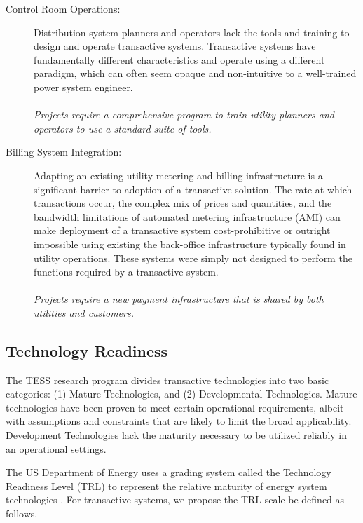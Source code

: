 \documentclass[10pt,twocolumn]{article}
\begin{document}
\begin{description}
    \item[Control Room Operations:] Distribution system planners and operators lack the tools and training to design and operate transactive systems. Transactive systems have fundamentally different characteristics and operate using a different paradigm, which can often seem opaque and non-intuitive to a well-trained power system engineer.  
    \\~\\
    \textit{Projects require a comprehensive program to train utility planners and operators to use a standard suite of tools.} 

    \item[Billing System Integration:] Adapting an existing utility metering and billing infrastructure is a significant barrier to adoption of a transactive solution.  The rate at which transactions occur, the complex mix of prices and quantities, and the bandwidth limitations of automated metering infrastructure (AMI) can make deployment of a transactive system cost-prohibitive or outright impossible using existing the back-office infrastructure typically found in utility operations. These systems were simply not designed to perform the functions required by a transactive system.  
    \\~\\
    \textit{Projects require a new payment infrastructure that is shared by both utilities and customers.}

\end{description}

\subsection{Technology Readiness}

The TESS research program divides transactive technologies into two basic categories: (1) Mature Technologies, and (2) Developmental Technologies.  Mature technologies have been proven to meet certain operational requirements, albeit with assumptions and constraints that are likely to limit the broad applicability.  Development Technologies lack the maturity necessary to be utilized reliably in an operational settings.

The US Department of Energy uses a grading system called the Technology Readiness Level (TRL) to represent the relative maturity of energy system technologies \cite{DOE-G413-2009}. For transactive systems, we propose the TRL scale be defined as follows.
\end{document}
